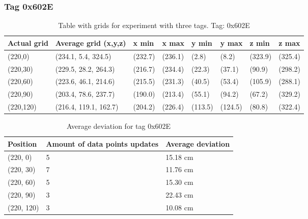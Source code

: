 \subsubsection{Tag 0x602E}
\begin{table}[H]
    \centering
    \begin{tabular}{|l|l|l|l|l|l|l|l|}
        \hline
        Actual grid & Average grid (x,y,z)  & x min   & x max   & y min   & y max   & z min   & z max   \\ \hline
        (220,0)     & (234.1, 5.4, 324.5)   & (232.7) & (236.1) & (2.8)   & (8.2)   & (323.9) & (325.4) \\ \hline
        (220,30)    & (229.5, 28.2, 264.3)  & (216.7) & (234.4) & (22.3)  & (37.1)  & (90.9)  & (298.2) \\ \hline
        (220,60)    & (223.6, 46.1, 214.6)  & (215.5) & (231.3) & (40.5)  & (53.4)  & (105.9) & (288.1) \\ \hline
        (220,90)    & (203.4, 78.6, 237.7)  & (190.0) & (213.4) & (55.1)  & (94.2)  & (67.2)  & (329.2) \\ \hline
        (220,120)   & (216.4, 119.1, 162.7) & (204.2) & (226.4) & (113.5) & (124.5) & (80.8)  & (322.4) \\ \hline
    \end{tabular}
    \caption{Table with grids for experiment with three tags. Tag: 0x602E}
    \label{Tab:three-tag-experiment-result-tag-0x602E}
\end{table}

\begin{table}[H]
    \centering
    \begin{tabular}{|l|l|l|}
        \hline
        Position   & Amount of data points updates & Average deviation \\ \hline
        (220, 0)   & 5                             & 15.18 cm          \\ \hline
        (220, 30)  & 7                             & 11.76 cm          \\ \hline
        (220, 60)  & 5                             & 15.30 cm          \\ \hline
        (220, 90)  & 3                             & 22.43 cm          \\ \hline
        (220, 120) & 3                             & 10.08 cm          \\ \hline
    \end{tabular}
    \caption{Average deviation for tag 0x602E}
\end{table}






